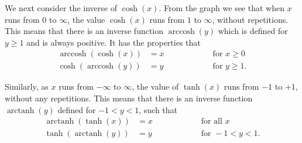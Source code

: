 \documentclass[a4paper]{book}
\newcommand{\arccosh}  {\operatorname{arccosh}}
\newcommand{\arctanh}  {\operatorname{arctanh}}
\renewcommand{\:}{\colon}
\theoremstyle{definition}
\begin{document}
We next consider the inverse of $\cosh(x)$.  From the graph we see
that when $x$ runs from $0$ to $\infty$, the value $\cosh(x)$ runs
from $1$ to $\infty$, without repetitions.  This means that there is
an inverse function $\arccosh(y)$ which is defined for $y\geq 1$ and
is always positive.  It has the properties that
\[ \begin{array}{rlll}
 \arccosh(\cosh(x)) &= x & \hspace{4em} & \text{ for } x\geq 0 \\
 \cosh(\arccosh(y)) &= y &              & \text{ for } y\geq 1.
\end{array} \]

Similarly, as $x$ runs from $-\infty$ to $\infty$, the value of
$\tanh(x)$ runs from $-1$ to $+1$, without any repetitions.  This
means that there is an inverse function $\arctanh(y)$ defined for
$-1<y<1$, such that
\[ \begin{array}{rlll}
 \arctanh(\tanh(x)) &= x & \hspace{4em} & \text{ for all } x \\
 \tanh(\arctanh(y)) &= y &              & \text{ for } -1<y<1.
\end{array} \]
\end{document}
